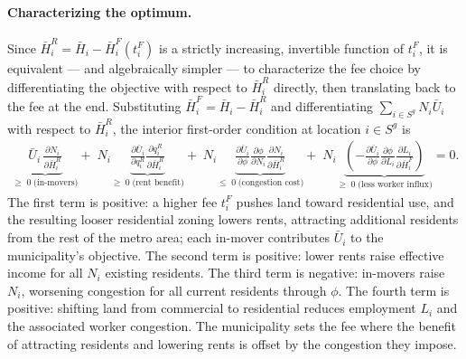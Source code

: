 \documentclass[12pt, a4paper]{article}
\theoremstyle{definition}
\begin{document}
\paragraph{Characterizing the optimum.} Since $\bar{H}_i^R = \bar{H}_i - \bar{H}_i^F(t_i^F)$ is a strictly increasing, invertible function of $t_i^F$, it is equivalent — and algebraically simpler — to characterize the fee choice by differentiating the objective with respect to $\bar{H}_i^R$ directly, then translating back to the fee at the end. Substituting $\bar{H}_i^F = \bar{H}_i - \bar{H}_i^R$ and differentiating $\sum_{i \in S^g} N_i\bar{U}_i$ with respect to $\bar{H}_i^R$, the interior first-order condition at location $i \in S^g$ is
\begin{align}
    \label{zoning-foc}
\underbrace{\bar{U}_i\,\frac{\partial N_i}{\partial \bar{H}_i^R}}_{\geq\;0\;\text{(in-movers)}}
+\;
N_i\!\underbrace{\frac{\partial \bar{U}_i}{\partial q_i^R}\frac{\partial q_i^R}{\partial \bar{H}_i^R}}_{\geq\;0\;\text{(rent benefit)}}
+\;
N_i\!\underbrace{\frac{\partial \bar{U}_i}{\partial \phi}\frac{\partial \phi}{\partial N_i}\frac{\partial N_i}{\partial \bar{H}_i^R}}_{\leq\;0\;\text{(congestion cost)}}
+\;
N_i\!\underbrace{\left(-\frac{\partial \bar{U}_i}{\partial \phi}\frac{\partial \phi}{\partial L_i}\frac{\partial L_i}{\partial \bar{H}_i^F}\right)}_{\geq\;0\;\text{(less worker influx)}}
= 0.
\end{align}
The first term is positive: a higher fee $t_i^F$ pushes land toward residential use, and the resulting looser residential zoning lowers rents, attracting additional residents from the rest of the metro area; each in-mover contributes $\bar{U}_i$ to the municipality's objective. The second term is positive: lower rents raise effective income for all $N_i$ existing residents. The third term is negative: in-movers raise $N_i$, worsening congestion for all current residents through $\phi$. The fourth term is positive: shifting land from commercial to residential reduces employment $L_i$ and the associated worker congestion. The municipality sets the fee where the benefit of attracting residents and lowering rents is offset by the congestion they impose.
\end{document}
